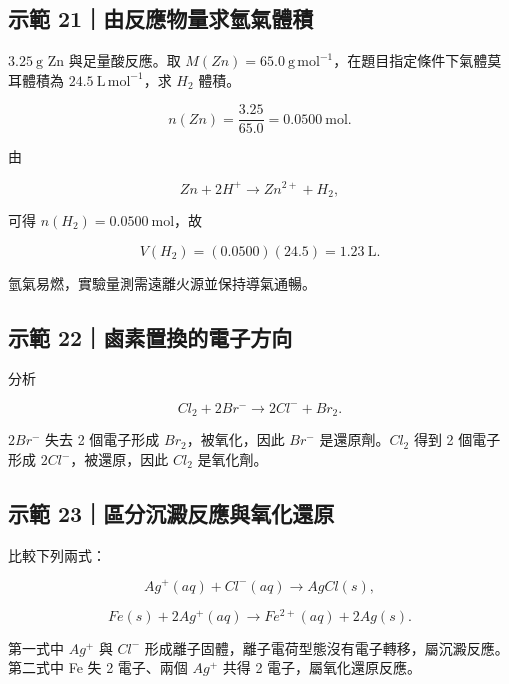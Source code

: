 \documentclass[11pt,a4paper]{article}
\begin{document}
\begin{HandoutWorkedExample}

\subsection{示範 21｜由反應物量求氫氣體積}\label{ux793aux7bc4-21ux7531ux53cdux61c9ux7269ux91cfux6c42ux6c2bux6c23ux9ad4ux7a4d}

\(3.25\ \mathrm g\) Zn 與足量酸反應。取 \(M(Zn)=65.0\ \mathrm{g\,mol^{-1}}\)，在題目指定條件下氣體莫耳體積為 \(24.5\ \mathrm{L\,mol^{-1}}\)，求 \(H_2\) 體積。

\[
n(Zn)=\frac{3.25}{65.0}=0.0500\ \mathrm{mol}.
\]

由

\[
Zn+2H^+\rightarrow Zn^{2+}+H_2,
\]

可得 \(n(H_2)=0.0500\ \mathrm{mol}\)，故

\[
V(H_2)=(0.0500)(24.5)=1.23\ \mathrm L.
\]

氫氣易燃，實驗量測需遠離火源並保持導氣通暢。

\end{HandoutWorkedExample}

\begin{HandoutWorkedExample}

\subsection{示範 22｜鹵素置換的電子方向}\label{ux793aux7bc4-22ux9e75ux7d20ux7f6eux63dbux7684ux96fbux5b50ux65b9ux5411}

分析

\[
Cl_2+2Br^-\rightarrow2Cl^-+Br_2.
\]

\(2Br^-\) 失去 2 個電子形成 \(Br_2\)，被氧化，因此 \(Br^-\) 是還原劑。\(Cl_2\) 得到 2 個電子形成 \(2Cl^-\)，被還原，因此 \(Cl_2\) 是氧化劑。

\end{HandoutWorkedExample}

\begin{HandoutWorkedExample}

\subsection{示範 23｜區分沉澱反應與氧化還原}\label{ux793aux7bc4-23ux5340ux5206ux6c89ux6fb1ux53cdux61c9ux8207ux6c27ux5316ux9084ux539f}

比較下列兩式：

\[
Ag^+(aq)+Cl^-(aq)\rightarrow AgCl(s),
\]

\[
Fe(s)+2Ag^+(aq)\rightarrow Fe^{2+}(aq)+2Ag(s).
\]

第一式中 \(Ag^+\) 與 \(Cl^-\) 形成離子固體，離子電荷型態沒有電子轉移，屬沉澱反應。第二式中 Fe 失 2 電子、兩個 \(Ag^+\) 共得 2 電子，屬氧化還原反應。

\end{HandoutWorkedExample}
\end{document}
